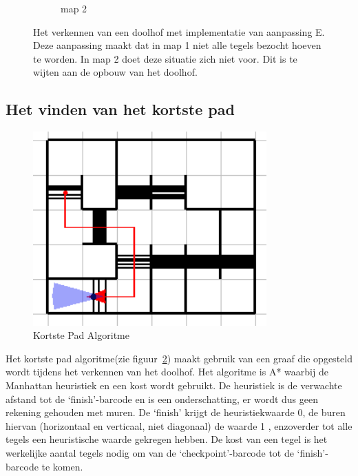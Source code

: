 \documentclass[tt3]{penoverslag}
\begin{document}
\begin{figure}
\begin{subfigure}[hb]{0.36\textwidth}
                \caption{map 2}
        \end{subfigure}
 \caption[Het verkennen van een doolhof]{Het verkennen van een doolhof met implementatie van aanpassing E. Deze aanpassing maakt dat in map 1 niet alle tegels bezocht hoeven te worden. In map 2 doet deze situatie zich niet voor. Dit is te wijten aan de opbouw van het doolhof.}
\label{fig:resultVerkenE}
\end{figure}

\subsection{Het vinden van het kortste pad} %
\label{ssec:AlgoKortsteP}

\begin{figure}[tbp]
\begin{center}
    \includegraphics[width=0.8\textwidth]{kortstepadvisual}
    \caption{Kortste Pad Algoritme}
	\label{fig:kortstepad}
\end{center}
\end{figure}

Het kortste pad algoritme(zie figuur~\ref{fig:kortstepad}) maakt gebruik van een graaf die opgesteld wordt tijdens het verkennen van het doolhof. Het algoritme is A* waarbij de Manhattan heuristiek en een kost wordt gebruikt.
De heuristiek is de verwachte afstand tot de `finish'-barcode en is een onderschatting, er wordt dus geen rekening gehouden met muren. De `finish' krijgt de heuristiekwaarde 0, de buren hiervan (horizontaal en verticaal, niet diagonaal) de waarde 1 , enzoverder tot alle tegels een heuristische waarde gekregen hebben.
De kost van een tegel is het werkelijke aantal tegels nodig om van de `checkpoint'-barcode tot de `finish'-barcode te komen.
\end{document}
